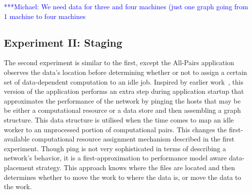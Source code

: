 \documentclass{rspublic}
\newcommand{\micnote}[1]{ {\textcolor{blue} { ***Michael: #1 }}}
\newcommand{\betynote}[1]{ {\textcolor{orange} { ***Bety: #1 }}}
\newcommand{\jhanote}[1]{} \newcommand{\micnote}[1]{}\newcommand{\betynote}[1]{} \newcommand{\fixme}[1]{}
\begin{document}
\jhanote{We need data for compute (comparison) and I/O (only) for
different data-set sizes} \micnote{We need data for three and four
machines (just one graph going from 1 machine to four machines}

\subsection{Experiment II: Staging}
The second experiment is similar to the
first, except the All-Pairs application observes the data's location
before determining whether or not to assign a certain set of
data-dependent computation to an idle job. Inspired by earlier
work~\citep{netperf}, this version of the application performs an extra
step during application startup that approximates the performance of the
network by pinging the hosts that may be be either a computational
resource or a data store and then assembling a graph structure. This
data structure is utilised when the time comes to map an idle worker to
an unprocessed portion of computational pairs. This changes the
first-available computational resource assignment mechanism described in
the first experiment. Though ping is not very sophisticated in terms of
describing a network's behavior, it is a first-approximation to
performance model aware data-placement strategy. This approach knows
where the files are located and then determines whether to move the work
to where the data is, or move the data to the work. \jhanote{Data-aware
placement is also required, i.e., managing location of files.} 
\end{document}
